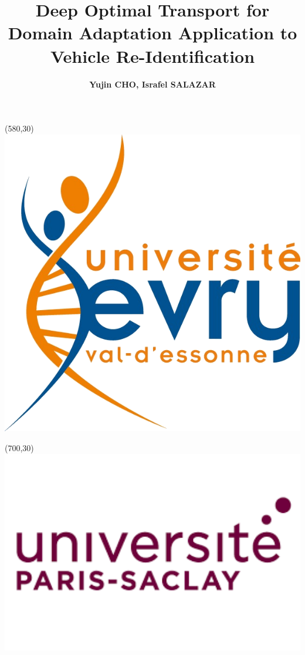\documentclass[final]{beamer}
\title{Deep Optimal Transport for Domain Adaptation Application to Vehicle Re-Identification}
\author{\textbf{Yujin CHO, Israfel SALAZAR}} %
\institute{M1 E3A @ Université Paris-Saclay. Paris, France} %
\begin{document}
\begin{textblock}{20}(580,30)
\includegraphics[scale=0.9]{images/evryyyy.png}
\end{textblock}

\begin{textblock}{20}(700,30)
\includegraphics[width=16cm]{images/logoParisSaclay.png}
\end{textblock}

\end{document}
